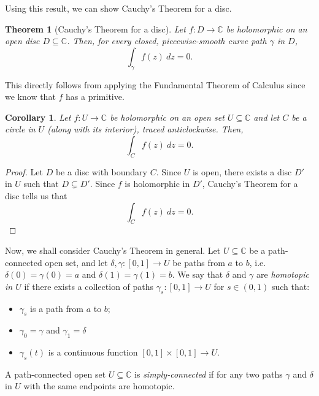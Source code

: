 \documentclass[a4paper, openany]{memoir}
\theoremstyle{definition}
\theoremstyle{plain}
\newtheorem{theorem}[definition]{Theorem}
\newtheorem{corollary}[definition]{Corollary}
\begin{document}
    Using this result, we can show Cauchy's Theorem for a disc.
    \begin{theorem}[Cauchy's Theorem for a disc]
        Let $f \colon D \to \mathbb{C}$ be holomorphic on an open disc $D \subseteq \mathbb{C}$. Then, for every closed, piecewise-smooth curve path $\gamma$ in $D$,
        \[\int_\gamma f(z) \ dz = 0.\]
    \end{theorem}
    This directly follows from applying the Fundamental Theorem of Calculus since we know that $f$ has a primitive.

    \begin{corollary}
        Let $f \colon U \to \mathbb{C}$ be holomorphic on an open set $U \subseteq \mathbb{C}$ and let $C$ be a circle in $U$ (along with its interior), traced anticlockwise. Then,
        \[\int_C f(z) \ dz = 0.\]
    \end{corollary}
    \begin{proof}
        Let $D$ be a disc with boundary $C$. Since $U$ is open, there exists a disc $D'$ in $U$ such that $D \subsetneq D'$. Since $f$ is holomorphic in $D'$, Cauchy's Theorem for a disc tells us that 
        \[\int_C f(z) \ dz = 0.\]
    \end{proof}

    Now, we shall consider Cauchy's Theorem in general. Let $U \subseteq \mathbb{C}$ be a path-connected open set, and let $\delta, \gamma \colon [0, 1] \to U$ be paths from $a$ to $b$, i.e. $\delta(0) = \gamma(0) = a$ and $\delta(1) = \gamma(1) = b$. We say that $\delta$ and $\gamma$ are \emph{homotopic in $U$} if there exists a collection of paths $\gamma_s \colon [0, 1] \to U$ for $s \in (0, 1)$ such that:
    \begin{itemize}
        \item $\gamma_s$ is a path from $a$ to $b$;
        \item $\gamma_0 = \gamma$ and $\gamma_1 = \delta$
        \item $\gamma_s(t)$ is a continuous function $[0, 1] \times [0, 1] \to U$.
    \end{itemize}
    A path-connected open set $U \subseteq \mathbb{C}$ is \emph{simply-connected} if for any two paths $\gamma$ and $\delta$ in $U$ with the same endpoints are homotopic. 
\end{document}
